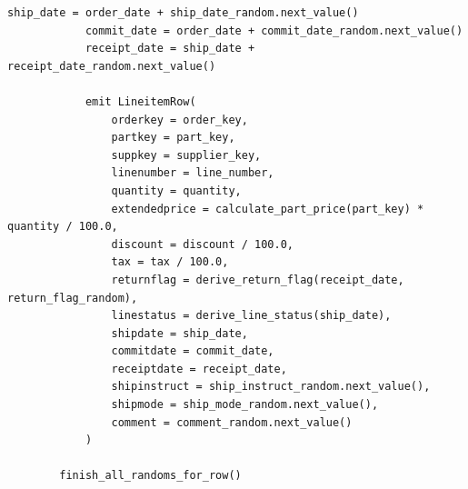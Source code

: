 \begin{lstlisting}[caption={Формирование таблицы lineitem}]
            ship_date = order_date + ship_date_random.next_value()
            commit_date = order_date + commit_date_random.next_value()
            receipt_date = ship_date + receipt_date_random.next_value()

            emit LineitemRow(
                orderkey = order_key,
                partkey = part_key,
                suppkey = supplier_key,
                linenumber = line_number,
                quantity = quantity,
                extendedprice = calculate_part_price(part_key) * quantity / 100.0,
                discount = discount / 100.0,
                tax = tax / 100.0,
                returnflag = derive_return_flag(receipt_date, return_flag_random),
                linestatus = derive_line_status(ship_date),
                shipdate = ship_date,
                commitdate = commit_date,
                receiptdate = receipt_date,
                shipinstruct = ship_instruct_random.next_value(),
                shipmode = ship_mode_random.next_value(),
                comment = comment_random.next_value()
            )

        finish_all_randoms_for_row()
\end{lstlisting}
